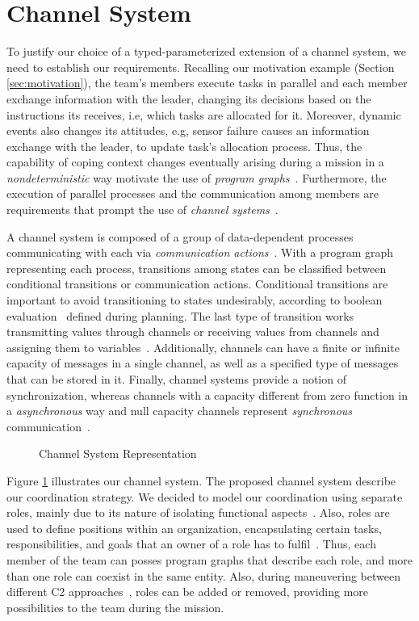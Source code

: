 \section{Channel System}
\label{sec:channelSystem}

To justify our choice of a typed-parameterized extension of a channel system, we need to establish our requirements. Recalling our motivation example (Section \ref{sec:motivation}), the team's members execute tasks in parallel and each member exchange information with the leader, changing its decisions based on the instructions its receives, i.e, which tasks are allocated for it. Moreover, dynamic events also changes its attitudes, e.g, sensor failure causes an information exchange with the leader, to update task's allocation process. Thus, the capability of coping context changes eventually arising during a mission in a \textit{nondeterministic} way motivate the use of \textit{program graphs}~\cite{modelcheckingBaier}. Furthermore, the execution of parallel processes and the communication among members are requirements that prompt the use of \textit{channel systems}~\cite{modelcheckingBaier}.

A channel system is composed of a group of data-dependent processes communicating with each via \textit{communication actions}~\cite{modelcheckingBaier}. With a program graph representing each process, transitions among states can be classified between conditional transitions or communication actions. Conditional transitions are important to avoid transitioning to states undesirably, according to boolean evaluation~\cite{modelcheckingBaier} defined during planning. The last type of transition works transmitting values through channels or receiving values from channels and assigning them to variables~\cite{modelcheckingBaier}. Additionally, channels can have a finite or infinite capacity of messages in a single channel, as well as a specified type of messages that can be stored in it. Finally, channel systems provide a notion of synchronization, whereas channels with a capacity different from zero function in a \textit{asynchronous} way and null capacity channels represent \textit{synchronous} communication~\cite{modelcheckingBaier}.

\begin{figure}[!ht]
    \centering
    \scalebox{.75}{}
    \caption{Channel System Representation}
    \label{fig:CS}
\end{figure}

Figure \ref{fig:CS} illustrates our channel system. The proposed channel system describe our coordination strategy. We decided to model our coordination using separate roles, mainly due to its nature of isolating functional aspects~\cite{roleOrientedModeling}. Also, roles are used to define positions within an organization, encapsulating certain tasks, responsibilities, and goals that an owner of a role has to fulfil~\cite{roleOrientedModeling}. Thus, each member of the team can posses program graphs that describe each role, and more than one role can coexist in the same entity. Also, during maneuvering between different C2 approaches~\cite{france2014}, roles can be added or removed, providing more possibilities to the team during the mission.

